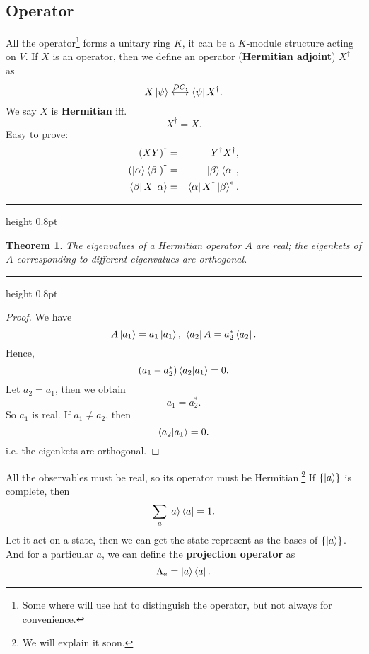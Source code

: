 \documentclass{article}
\newcommand{\singleline}{\hrule height 0.8pt}
\theoremstyle{1}
\newtheorem{theorem}[problem]{Theorem}
\begin{document}
\subsection{Operator}
All the operator\footnote{Some where will use hat to distinguish the operator, but not always for convenience.} forms a unitary ring $K$, it can be a $K$-module structure acting on $V$. If $X$ is an operator, then we define an operator (\textbf{Hermitian adjoint}) $X^\dagger$ as 
\begin{equation}
   X\ket{\psi} \overset{DC.}{\longleftrightarrow}\bra{\psi}X^\dagger.
\end{equation}
We say $X$ is \textbf{Hermitian} iff.
\begin{equation}
    X^\dagger=X.
\end{equation}
Easy to prove:
\begin{eqnarray}
    (XY)^\dagger&=&Y^\dagger X^\dagger,\\
    \left(\ket{\alpha}\bra{\beta}\right)^\dagger&=&\ket{\beta}\bra{\alpha},\\
    \bra{\beta}X\ket{\alpha}&=&\bra{\alpha}X^\dagger\ket{\beta}^*.
\end{eqnarray}
\singleline
\begin{theorem}
    \quad The eigenvalues of a Hermitian operator $A$ are real; the eigenkets
of $A$ corresponding to different eigenvalues are orthogonal.
\end{theorem}
\singleline
\begin{proof}
    We have 
    \begin{equation}
        A\ket{a_1}=a_1\ket{a_1},\  \bra{a_2}A=a_2^*\bra{a_2}.
    \end{equation}
Hence, 
\begin{equation}
    \left(a_1-a_2^*\right)\braket{a_2}{a_1}=0.
\end{equation}
Let $a_2=a_1$, then we obtain
\begin{equation}
    a_1=a_2^*.
\end{equation}
So $a_1$ is real. If $a_1\not=a_2$, then 
\begin{equation}
    \braket{a_2}{a_1}=0.
\end{equation}
i.e. the eigenkets are orthogonal.
\end{proof}
All the observables must be real, so its operator must be Hermitian.\footnote{We will explain it soon.}
\newline
If $\left\{\ket{a}\right\}$ is complete, then 
\begin{equation}\label{unit operator}
    \sum_{a}\ket{a}\bra{a}=1.
\end{equation}
Let it act on a state, then we can get the state represent as the bases of $\left\{\ket{a}\right\}$. And for a particular $a$, we can define the \textbf{projection operator} as 
\begin{equation}
    \Lambda_a=\ket{a}\bra{a}.
\end{equation}
\end{document}
